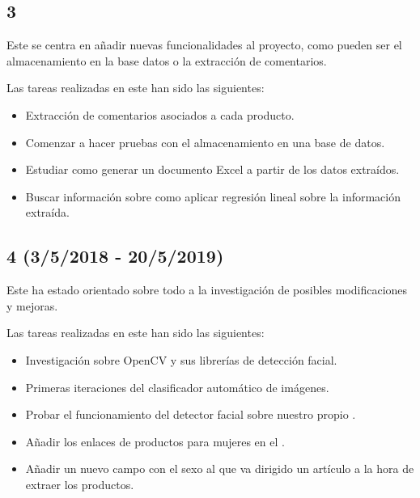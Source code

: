 \subsection{ 3} %
Este  se centra en añadir nuevas funcionalidades al proyecto, como pueden ser el almacenamiento en la base datos o la extracción de comentarios.


Las tareas realizadas en este  han sido las siguientes:
 
\begin{itemize}
    \item Extracción de comentarios asociados a cada producto.
    \item Comenzar a hacer pruebas con el almacenamiento en una base de datos.
    \item Estudiar como generar un documento Excel a partir de los datos extraídos.
    \item Buscar información sobre como aplicar regresión lineal sobre la información extraída.
\end{itemize}

\subsection{ 4 (3/5/2018 - 20/5/2019)}
Este  ha estado orientado sobre todo a la investigación de posibles modificaciones y mejoras.


Las tareas realizadas en este  han sido las siguientes:
 
\begin{itemize}
    \item Investigación sobre OpenCV y sus librerías de detección facial.
    \item Primeras iteraciones del clasificador automático de imágenes.
    \item Probar el funcionamiento del detector facial sobre nuestro propio .
    \item Añadir los enlaces de productos para mujeres en el .
    \item Añadir un nuevo campo con el sexo al que va dirigido un artículo a la hora de extraer los productos.
\end{itemize}


